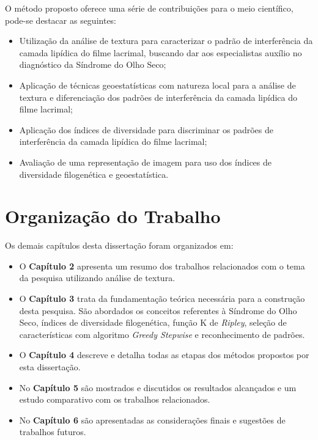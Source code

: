 O método proposto oferece uma série de contribuições para o meio científico, pode-se destacar as seguintes:

\begin{itemize}

    \item Utilização da análise de textura para caracterizar o padrão de interferência da camada lipídica do filme lacrimal, buscando dar aos especialistas auxílio no diagnóstico da Síndrome do Olho Seco;
    
    \item Aplicação de técnicas geoestatísticas com natureza local para a análise de textura e diferenciação dos padrões de interferência da camada lipídica do filme lacrimal;
    
    \item Aplicação dos índices de diversidade para discriminar os padrões de interferência da camada lipídica do filme lacrimal;
    
    \item Avaliação de uma representação de imagem para uso dos índices de diversidade filogenética e geoestatística.
    
\end{itemize}

\section{Organização do Trabalho}
Os demais capítulos desta dissertação foram organizados em:

\begin{itemize}

    \item O \textbf{Capítulo 2} apresenta um resumo dos trabalhos relacionados com o tema da pesquisa utilizando análise de textura.

    \item O \textbf{Capítulo 3} trata da fundamentação teórica necessária para a construção desta pesquisa. São abordados os conceitos referentes à Síndrome do Olho Seco, índices de diversidade filogenética, função K de \textit{Ripley}, seleção de características com algoritmo \textit{Greedy Stepwise} e reconhecimento de padrões.

    \item O \textbf{Capítulo 4} descreve e detalha todas as etapas dos métodos propostos por esta dissertação.

    \item No \textbf{Capítulo 5} são mostrados e discutidos os resultados alcançados e um estudo comparativo com os trabalhos relacionados.

    \item No \textbf{Capítulo 6} são apresentadas as considerações finais e sugestões de trabalhos futuros.

\end{itemize}
